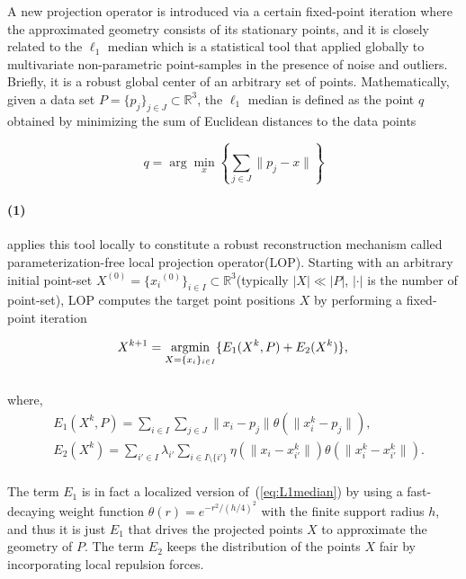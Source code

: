 A new projection operator is introduced via a certain fixed-point iteration where the approximated geometry consists of its stationary points,
and it is closely related to the $\ell_1$ median\cite{brown1983statistical,small1990survey} which is a statistical tool that applied globally to multivariate non-parametric point-samples in the presence of noise and outliers.
Briefly, it is a robust global center of an arbitrary set of points. Mathematically, given a data set $P=\{p_{j}\}_{j\in J}\subset \mathbb{R}^3$, the $\ell_1$ median is defined as the point $q$ obtained by minimizing the sum of Euclidean distances to the data points

\small{
\begin{equation}
 \label{eq:L1median}
 q=\arg\min_{x}\left\{ \sum_{j\in J}^{}\|p_{j}-x\| \right\}
\end{equation}
}

\paragraph{(1)}

\cite{lipman2007parameterization} applies this tool locally to constitute a robust reconstruction mechanism called parameterization-free local projection operator(LOP).
Starting with an arbitrary initial point-set $X^{(0)}=\{{x_{i}}^{(0)}\}_{i\in I}\subset \mathbb{R}^3$(typically $|X|\ll|P|$, $|\cdot|$ is the number of point-set),
LOP computes the target point positions $X$ by performing a fixed-point iteration

\small{
\begin{equation}
 \label{eq:LOP1}
 X^{k+1}=\mathop{\operatorname*{argmin}}_{X=\{x_{i}\}_{i\in I}}\{E_1(X^{k},P)+E_2(X^{k})\},\\
\end{equation}
}
\\
where,
\small{
\begin{equation}
 \label{eq:LOP2}
 \begin{split}
 & E_1(X^{k},P)=\sum_{i\in I}^{}\sum_{j\in J}^{}\|x_{i}-p_{j}\|\theta(\|x{_i^k}-p_{j}\|),\\
 & E_2(X^{k})=\sum_{i'\in I}^{}\lambda_{i'}\sum_{i\in I\setminus\{i'\}}^{} \eta(\|x_{i}-x{_{i'}^k}\|)\theta(\|x{_i^k}-x{_{i'}^k}\|).
 \end{split}
\end{equation}
}
\\
The term $E_1$ is in fact a localized version of~(\ref{eq:L1median}) by using a fast-decaying weight function $\theta(r)=e^{-r^2/(h/4)^2}$ with the finite support radius $h$,
and thus it is just $E_1$ that drives the projected points $X$ to approximate the geometry of $P$.
The term $E_2$ keeps the distribution of the points $X$ fair by incorporating local repulsion forces.

